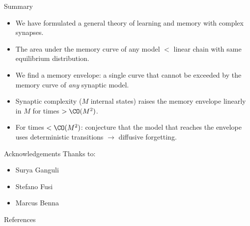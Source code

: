 \documentclass{beamer}%
\begin{document}

\begin{frame}{Summary}
%
  \begin{itemize}
    \item We have formulated a general theory of learning and memory with complex synapses.
    \item The area under the memory curve of any model $<$ linear chain with same equilibrium distribution.
    \item We find a memory envelope: a single curve that cannot be exceeded by the memory curve of \emph{any} synaptic model.
    \item Synaptic complexity ($M$ internal states) raises the memory envelope linearly in $M$ for times $> \CO(M^2)$.
    \item For times $< \CO(M^2)$: conjecture that the model that reaches the envelope uses deterministic transitions $\to$ diffusive forgetting.
  \end{itemize}

%
\end{frame}





%
%
%

\begin{frame}{Acknowledgements}
%
 Thanks to:
 \begin{itemize}
   \item Surya Ganguli
   \item Stefano Fusi
   \item Marcus Benna
 \end{itemize}
%
\end{frame}


\begin{frame}[allowframebreaks]{References}
%

 {\small
 
 
 }
%
\end{frame}
\end{document}
